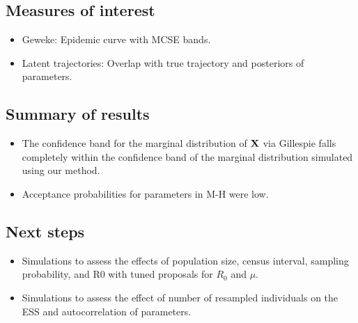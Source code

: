 \subsection*{Measures of interest}
\begin{itemize}
	\item Geweke: Epidemic curve with MCSE bands.
	\item Latent trajectories: Overlap with true trajectory and posteriors of parameters.
\end{itemize}

\subsection*{Summary of results}
\begin{itemize}
	\item The confidence band for the marginal distribution of $ \mathbf{X} $ via Gillespie falls completely within the confidence band of the marginal distribution simulated using our method. 
	\item Acceptance probabilities for parameters in M-H were low. 
\end{itemize}

\subsection*{Next steps}
\begin{itemize}
	\item Simulations to assess the effects of population size, census interval, sampling probability, and R0 with tuned proposals for $ R_0  $ and $ \mu $. 
	\item Simulations to assess the effect of number of resampled individuals on the ESS and autocorrelation of parameters.
\end{itemize}